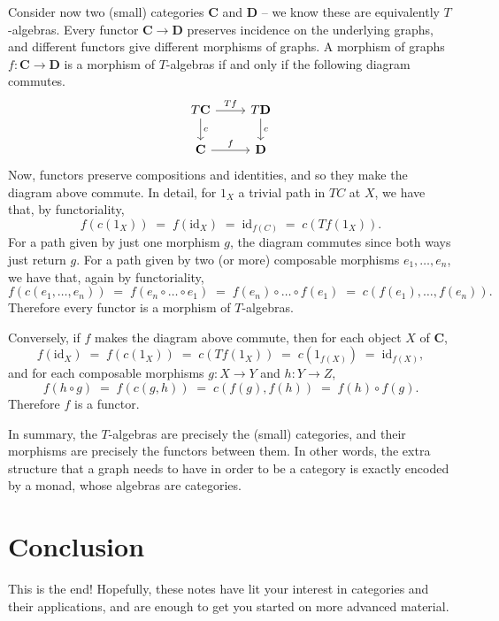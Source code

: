 \documentclass[12pt,oneside]{scrbook}
\makeatletter
\newcommand*{\currentname}{\@currentlabelname}
\numberwithin{equation}{section}
\theoremstyle{plain}
\theoremstyle{definition}
\newcommand{\cat}[1]{{\mathbf{#1}}} %
\newcommand{\ar}[2][]{\arrow{#2}{#1}}
\DeclareMathOperator{\1}{\mathbbm{1}}
\DeclareMathOperator{\2}{\mathbbm{2}}
\newcommand{\id}{\mathrm{id}} %
\makeatother
\begin{document}
 Consider now two (small) categories $\cat{C}$ and $\cat{D}$ -- we know these are equivalently $T$-algebras. Every functor $\cat{C}\to\cat{D}$ preserves incidence on the underlying graphs, and different functors give different morphisms of graphs. A morphism of graphs $f:\cat{C}\to\cat{D}$ is a morphism of $T$-algebras if and only if the following diagram commutes.
 $$
 \begin{tikzcd}
  T\cat{C} \ar{d}{c} \ar{r}{Tf} & T\cat{D} \ar{d}{c} \\
  \cat{C} \ar{r}{f} & \cat{D}
 \end{tikzcd}
 $$
 Now, functors preserve compositions and identities, and so they make the diagram above commute. In detail, for $1_X$ a trivial path in $TC$ at $X$, we have that, by functoriality,
 $$
 f(c(1_X)) \;=\; f(\id_X) \;=\; \id_{f(C)} \;=\; c(Tf(1_X)).
 $$
 For a path given by just one morphism $g$, the diagram commutes since both ways just return $g$.
 For a path given by two (or more) composable morphisms $e_1,\dots,e_n$, we have that, again by functoriality,
 $$
 f(c(e_1,\dots,e_n)) \;=\; f(e_n\circ\dots\circ e_1) \;=\;f(e_n)\circ\dots\circ f(e_1) \;=\; c(f(e_1),\dots,f(e_n)) .
 $$
 Therefore every functor is a morphism of $T$-algebras.
 
 Conversely, if $f$ makes the diagram above commute, then for each object $X$ of $\cat{C}$,
 $$
 f(\id_X) \;=\; f(c(1_X)) \;=\; c(Tf(1_X)) \;=\; c(1_{f(X)}) \;=\; \id_{f(X)} ,
 $$
 and for each composable morphisms $g:X\to Y$ and $h:Y\to Z$, 
 $$
 f(h\circ g) \;=\; f(c(g,h)) \;=\; c(f(g),f(h)) \;=\; f(h) \circ f(g) .
 $$
 Therefore $f$ is a functor. 
 
 In summary, the $T$-algebras are precisely the (small) categories, and their morphisms are precisely the functors between them. In other words, the extra structure that a graph needs to have in order to be a category is exactly encoded by a monad, whose algebras are categories.




\newpage
\chapter*{Conclusion}
\addcontentsline{toc}{chapter}{\currentname}


This is the end!  Hopefully, these notes have lit your interest in categories and their applications, and are enough to get you started on more advanced material. 
\end{document}
